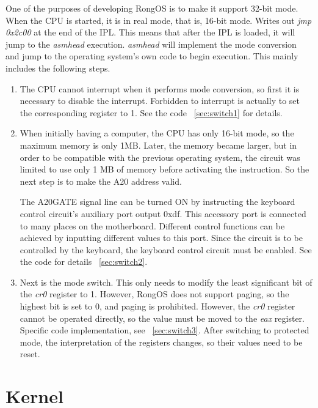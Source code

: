 \documentclass{swfcthesis}
\begin{document}
One of the purposes of developing RongOS is to make it support 32-bit mode. When the CPU
is started, it is in real mode, that is, 16-bit mode. Writes out \emph{jmp 0x2c00} at the
end of the IPL. This means that after the IPL is loaded, it will jump to the \emph{asmhead}
execution. \emph{asmhead} will implement the mode conversion and jump to the operating system's
own code to begin execution. This mainly includes the following steps.
\begin{enumerate}
\item The CPU cannot interrupt when it performs mode conversion, so first it is necessary
  to disable the interrupt. Forbidden to interrupt is actually to set the corresponding
  register to 1. See the code ~\ref{sec:switch1} for details.

\item When initially having a computer, the CPU has only 16-bit mode, so the maximum
  memory is only 1MB. Later, the memory became larger, but in order to be compatible with
  the previous operating system, the circuit was limited to use only 1 MB of memory before
  activating the instruction. So the next step is to make the A20 address valid.

  The A20GATE signal line can be turned ON by instructing the keyboard control circuit's
  auxiliary port output 0xdf. This accessory port is connected to many places on the
  motherboard. Different control functions can be achieved by inputting different values
  to this port. Since the circuit is to be controlled by the keyboard, the keyboard
  control circuit must be enabled. See the code for details ~\ref{sec:switch2}.

\item Next is the mode switch. This only needs to modify the least significant bit of the
  \emph{cr0} register to 1. However, RongOS does not support paging, so the highest bit is
  set to 0, and paging is prohibited. However, the \emph{cr0} register cannot be operated
  directly, so the value must be moved to the \emph{eax} register. Specific code
  implementation, see ~\ref{sec:switch3}. After switching to protected mode, the
  interpretation of the registers changes, so their values need to be reset.

\end{enumerate}





\section{Kernel}
\label{sec:kernel-1}
\end{document}
